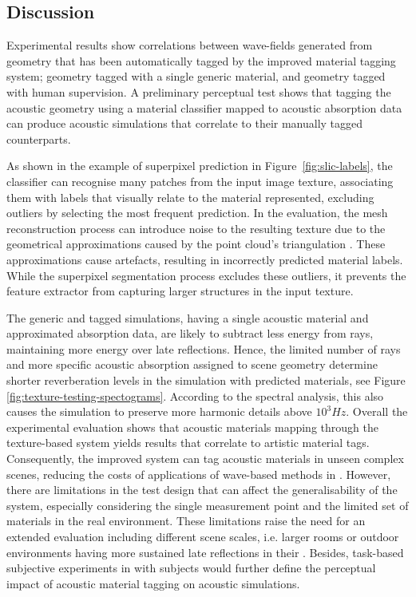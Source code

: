 \subsection{Discussion}
Experimental results show correlations between wave-fields generated from geometry that has been automatically tagged by the improved material tagging system; geometry tagged with a single generic material, and geometry tagged with human supervision. A preliminary perceptual test shows that tagging the acoustic geometry using a material classifier mapped to acoustic absorption data can produce acoustic simulations that correlate to their manually tagged counterparts.\par
As shown in the example of superpixel prediction in Figure~\ref{fig:slic-labels}, the classifier can recognise many patches from the input image texture, associating them with labels that visually relate to the material represented, excluding outliers by selecting the most frequent prediction. In the evaluation, the mesh reconstruction process can introduce noise to the resulting texture due to the geometrical approximations caused by the point cloud's triangulation \cite{turner2014fast}. These approximations cause artefacts, resulting in incorrectly predicted material labels. While the superpixel segmentation process excludes these outliers, it prevents the feature extractor from capturing larger structures in the input texture.\par
The generic and tagged simulations, having a single acoustic material and approximated absorption data, are likely to subtract less energy from rays, maintaining more energy over late reflections. Hence, the limited number of rays and more specific acoustic absorption assigned to scene geometry determine shorter reverberation levels in the simulation with predicted materials, see Figure \ref{fig:texture-testing-spectograms}. According to the spectral analysis, this also causes the simulation to preserve more harmonic details above $10^3 Hz$. Overall the experimental evaluation shows that acoustic materials mapping through the texture-based system yields results that correlate to artistic material tags. Consequently, the improved system can tag acoustic materials in unseen complex scenes, reducing the costs of applications of wave-based methods in . However, there are limitations in the test design that can affect the generalisability of the system, especially considering the single measurement point and the limited set of materials in the real environment. These limitations raise the need for an extended evaluation including different scene scales, i.e. larger rooms or outdoor environments having more sustained late reflections in their . Besides, task-based subjective experiments in  with subjects would further define the perceptual impact of acoustic material tagging on acoustic simulations.\par


